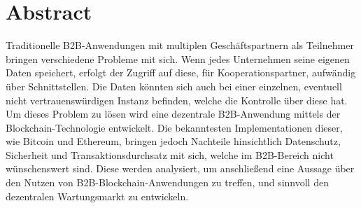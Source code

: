 \pagestyle{empty} %


\chapter*{Abstract} %
\label{cha:abtract}
Traditionelle B2B-Anwendungen mit multiplen Geschäftspartnern als Teilnehmer bringen verschiedene Probleme mit sich. Wenn jedes Unternehmen seine eigenen Daten speichert, erfolgt der Zugriff auf diese, für Kooperationspartner, aufwändig über Schnittstellen. Die Daten könnten sich auch bei einer einzelnen, eventuell nicht vertrauenswürdigen Instanz befinden, welche die Kontrolle über diese hat. Um dieses Problem zu lösen wird eine dezentrale B2B-Anwendung mittels der Blockchain-Technologie entwickelt. Die bekanntesten Implementationen dieser, wie Bitcoin und Ethereum, bringen jedoch Nachteile hinsichtlich Datenschutz, Sicherheit und Transaktionsdurchsatz mit sich, welche im B2B-Bereich nicht wünschenswert sind. Diese werden analysiert, um anschließend eine Aussage über den Nutzen von B2B-Blockchain-Anwendungen zu treffen, und sinnvoll den dezentralen Wartungsmarkt zu entwickeln.
